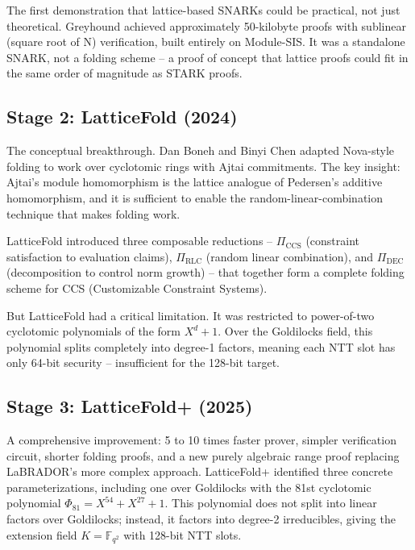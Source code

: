 \documentclass[
  11pt,
  openany]{report}
\begin{document}
The first demonstration that lattice-based SNARKs could be practical, not just
theoretical. Greyhound achieved approximately 50-kilobyte proofs with sublinear
(square root of N) verification, built entirely on Module-SIS. It was a
standalone SNARK, not a folding scheme -- a proof of concept that lattice proofs
could fit in the same order of magnitude as STARK proofs.

\subsection{Stage 2: LatticeFold (2024)}\label{stage-2-latticefold-2024}

The conceptual breakthrough. Dan Boneh and Binyi Chen adapted Nova-style folding
to work over cyclotomic rings with Ajtai commitments. The key insight: Ajtai's
module homomorphism is the lattice analogue of Pedersen's additive homomorphism,
and it is sufficient to enable the random-linear-combination technique that
makes folding work.

LatticeFold introduced three composable reductions -- \(\Pi_{\text{CCS}}\)
(constraint satisfaction to evaluation claims), \(\Pi_{\text{RLC}}\) (random
linear combination), and \(\Pi_{\text{DEC}}\) (decomposition to control norm
growth) -- that together form a complete folding scheme for CCS (Customizable
Constraint Systems).

But LatticeFold had a critical limitation. It was restricted to power-of-two
cyclotomic polynomials of the form \(X^d + 1\). Over the Goldilocks field, this
polynomial splits completely into degree-1 factors, meaning each NTT slot has
only 64-bit security -- insufficient for the 128-bit target.

\subsection{Stage 3: LatticeFold+ (2025)}\label{stage-3-latticefold-2025}

A comprehensive improvement: 5 to 10 times faster prover, simpler verification
circuit, shorter folding proofs, and a new purely algebraic range proof
replacing LaBRADOR's more complex approach. LatticeFold+ identified three
concrete parameterizations, including one over Goldilocks with the 81st
cyclotomic polynomial \(\Phi_{81} = X^{54} + X^{27} + 1\). This polynomial does
not split into linear factors over Goldilocks; instead, it factors into degree-2
irreducibles, giving the extension field \(K = \mathbb{F}_{q^2}\) with 128-bit
NTT slots.
\end{document}
